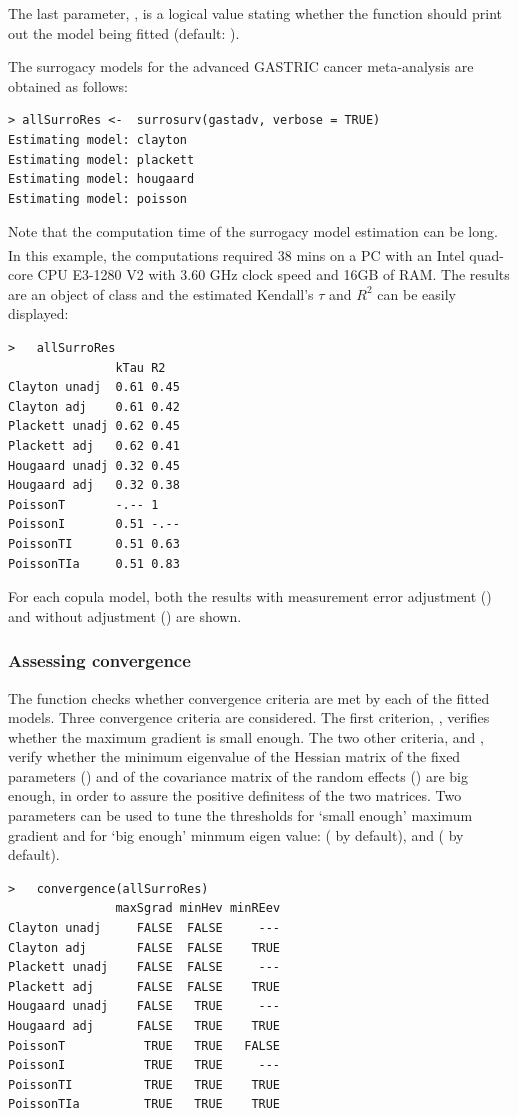 \documentclass[]{scrartcl}\usepackage[]{graphicx}\usepackage[]{color}
\begin{document}
{{  The last parameter, , is a logical value
  stating whether the function should print out the model being fitted
  (default: ).
  
  
  The surrogacy models for the advanced GASTRIC cancer meta-analysis
  are obtained as follows:
\begin{lstlisting}
> allSurroRes <-  surrosurv(gastadv, verbose = TRUE)
Estimating model: clayton
Estimating model: plackett
Estimating model: hougaard
Estimating model: poisson
\end{lstlisting}
Note that the computation time of the surrogacy model estimation can be long.
In this example, the computations required
  38
  mins
  on a PC with an Intel\textsuperscript{\textregistered} quad-core CPU E3-1280 V2
  with 3.60 GHz clock speed and 16GB of RAM.
The results are an object of class 
  and the estimated Kendall's $\tau$ and $R^2$ can be easily displayed:
\begin{lstlisting}
>   allSurroRes
               kTau R2  
Clayton unadj  0.61 0.45
Clayton adj    0.61 0.42
Plackett unadj 0.62 0.45
Plackett adj   0.62 0.41
Hougaard unadj 0.32 0.45
Hougaard adj   0.32 0.38
PoissonT       -.-- 1   
PoissonI       0.51 -.--
PoissonTI      0.51 0.63
PoissonTIa     0.51 0.83
\end{lstlisting}
For each copula model,
  both the results with measurement error adjustment ()
  and without adjustment () are shown.

\subsubsection{Assessing convergence}
The function  checks whether convergence criteria
  are met by each of the fitted models.
Three convergence criteria are considered.
The first criterion, ,
  verifies whether the maximum gradient is small enough.
The two other criteria,  and ,
  verify whether the minimum eigenvalue
  of the Hessian matrix of the fixed parameters ()
  and of the covariance matrix of the random effects ()
  are big enough,
  in order to assure the positive definitess of the two matrices.
Two parameters can be used to tune the thresholds
  for `small enough' maximum gradient and 
  for `big enough' minmum eigen value:
   ( by default),
  and  ( by default).
\begin{lstlisting}
>   convergence(allSurroRes)
               maxSgrad minHev minREev
Clayton unadj     FALSE  FALSE     ---
Clayton adj       FALSE  FALSE    TRUE
Plackett unadj    FALSE  FALSE     ---
Plackett adj      FALSE  FALSE    TRUE
Hougaard unadj    FALSE   TRUE     ---
Hougaard adj      FALSE   TRUE    TRUE
PoissonT           TRUE   TRUE   FALSE
PoissonI           TRUE   TRUE     ---
PoissonTI          TRUE   TRUE    TRUE
PoissonTIa         TRUE   TRUE    TRUE
\end{lstlisting}

}}
\end{document}
